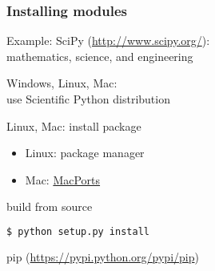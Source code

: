 \begin{frame}[fragile]
\frametitle{Installing modules}

Example: SciPy (\url{http://www.scipy.org/}):\\
mathematics, science, and engineering

\begin{description}
\item<2->[Easy way:] Windows, Linux, Mac:\\
use Scientific Python distribution
\item<3->[Intermediate:] Linux, Mac: install package\\
\begin{itemize}
\item Linux: package manager
\item Mac: \href{https://www.macports.org/}{MacPorts}
\end{itemize}
\item<4->[Harder:] build from source
\begin{lstlisting}[language=bash]
 $ python setup.py install
\end{lstlisting}
\item<5->[Better:] pip (\url{https://pypi.python.org/pypi/pip})
\end{description}

\end{frame}


